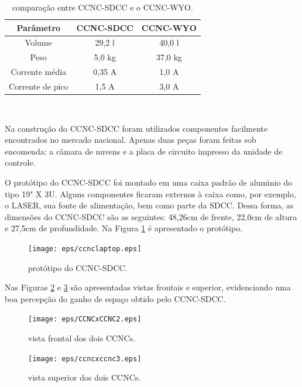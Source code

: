 \begin{table}[!htbp]
\centering \caption{\label{alpaequip} compara\c{c}\~{a}o entre CCNC-SDCC e o CCNC-WYO.}
\begin{tabular}{ c | c c}
  \hline
  Par\^{a}metro & CCNC-SDCC & CCNC-WYO\\
  \hline
  Volume & 29,2 l & 40,0 l\\
  Peso & 5,0 kg & 37,0 kg\\
  Corrente m\'{e}dia & 0,35 A & 1,0 A\\
  Corrente de pico & 1,5 A & 3,0 A \\
  \hline
\end{tabular}\\
\end{table}

Na constru\c{c}\~{a}o do CCNC-SDCC foram utilizados componentes facilmente encontrados no mercado nacional. Apenas duas pe\c{c}as foram feitas sob encomenda: a c\^{a}mara de nuvens e a placa de circuito impresso da unidade de controle.

O prot\'{o}tipo do CCNC-SDCC foi montado em uma caixa padr\~{a}o de alum\'{\i}nio do tipo 19" X 3U. Alguns componentes ficaram externos \`{a} caixa como, por exemplo, o LASER, sua fonte de alimenta\c{c}\~{a}o, bem como parte da SDCC. Dessa forma, as dimens\~{o}es do CCNC-SDCC s\~{a}o as seguintes: 48,26cm de frente, 22,0cm de altura e 27,5cm de profundidade. Na Figura \ref{CCNC-SDCC} \'{e} apresentado o prot\'{o}tipo.

\begin{figure}[hbt]
\begin{center}
\texttt{[image: eps/ccnclaptop.eps]}\\
\end{center}
\caption{\label{CCNC-SDCC}\hspace{-0.1em} prot\'{o}tipo do CCNC-SDCC.}
\end{figure}

Nas Figuras \ref{CCNCxCCNC2} e \ref{ccncxccnc3} s\~{a}o apresentadas vistas frontais e superior, evidenciando uma boa percep\c{c}\~{a}o do ganho de espa\c{c}o obtido pelo CCNC-SDCC.


\begin{figure}[hbt]
\begin{center}
\texttt{[image: eps/CCNCxCCNC2.eps]}\\
\end{center}
\caption{\label{CCNCxCCNC2}\hspace{-0.1em} vista frontal dos dois CCNCs.}
\end{figure}


\begin{figure}[hbt]
\begin{center}
\texttt{[image: eps/ccncxccnc3.eps]}\\
\end{center}
\caption{\label{ccncxccnc3}\hspace{-0.1em} vista superior dos dois CCNCs.}
\end{figure}

